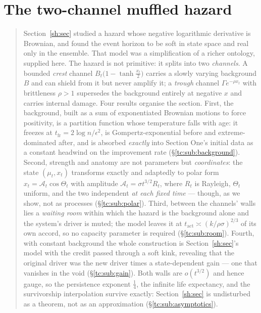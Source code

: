 \documentclass[11pt]{article}
\numberwithin{equation}{section}
\theoremstyle{plain}
\theoremstyle{definition}
\theoremstyle{remark}
\newcommand{\Ac}{\mathcal{A}}
\begin{document}
\section{The two-channel muffled hazard}\label{tc:sec}

\begin{quote}\small
Section~\ref{sh:sec} studied a hazard whose negative logarithmic derivative is
Brownian, and found the event horizon to be soft in state space and real
only in the ensemble. That model was a simplification of a richer
ontology, supplied here. The hazard is not primitive: it splits into two
\emph{channels}. A bounded \emph{crest} channel
$B_t\bigl(1-\tanh\tfrac{x_t}{2}\bigr)$ carries a slowly varying
background $B$ and can shield from it but never amplify it; a
\emph{trough} channel $\Gamma e^{-\rho x_t}$ with brittleness $\rho>1$
supersedes the background entirely at negative $x$ and carries internal
damage. Four results organise the section. First, the background, built
as a sum of exponentiated Brownian motions to force positivity, is a
partition function whose temperature falls with age: it freezes at
$t_{\mathrm{fr}}=2\log n/\epsilon^{2}$, is Gompertz-exponential before
and extreme-dominated after, and is absorbed \emph{exactly} into Section
One's initial data as a constant headwind on the improvement rate
(\S\ref{tc:sub:background}). Second, strength and anatomy are not
parameters but \emph{coordinates}: the state $(\mu_t,x_t)$ transforms
exactly and adaptedly to polar form $x_t=\Ac_t\cos\Theta_t$ with
amplitude $\Ac_t=\sigma t^{3/2}R_t$, where $R_t$ is Rayleigh, $\Theta_t$
uniform, and the two independent \emph{at each fixed time} --- though,
as we show, not as processes (\S\ref{tc:sub:polar}). Third, between the
channels' walls lies a \emph{waiting room} within which the hazard is
the background alone and the system's driver is muted; the model leaves
it at $t_{\mathrm{act}}\asymp(k/\rho\sigma)^{2/3}$ of its own accord, so
no capacity parameter is required (\S\ref{tc:sub:room}). Fourth, with
constant background the whole construction is Section~\ref{sh:sec}'s model with
the credit passed through a soft kink, revealing that the original
driver was the new driver times a state-dependent gain --- one that
vanishes in the void (\S\ref{tc:sub:gain}). Both walls are $o(t^{3/2})$
and hence gauge, so the persistence exponent $\tfrac14$, the infinite
life expectancy, and the survivorship interpolation survive exactly:
Section~\ref{sh:sec} is undisturbed as a theorem, not as an approximation
(\S\ref{tc:sub:asymptotics}).
\end{quote}
\end{document}
